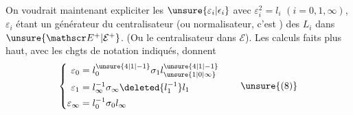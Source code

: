 On voudrait maintenant expliciter les $\unsure{\varepsilon_i|\epsilon_i}$ avec $\varepsilon_i^2=l_i$ $(i=0,1,\infty)$, $\varepsilon_i$ étant un générateur du centralisateur (ou normalisateur, c'est ) des $L_i$ dans $\unsure{\mathscr E^+|\mathcal E^+}$. (Ou le centralisateur dans $\mathscr E$). Les calculs faits plus haut, avec les chgts de notation indiqués, donnent
\[
\left\{\begin{aligned}
\varepsilon_0&=l_0^{\unsure{4|1|-1}}\sigma_1l_{\unsure{1|0|\infty}}^{\unsure{4|1|-1}}\\
\varepsilon_1&=l_\infty^{-1}\sigma_\infty\deleted{l_1^{-1}}l_1\\
\varepsilon_\infty&=l_0^{-1}\sigma_0l_\infty
\end{aligned}\right.\tag*{\unsure{(8)}}
\]
